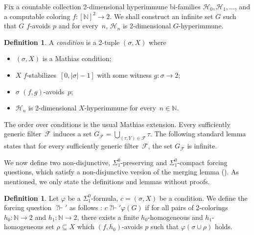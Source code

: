 \documentclass{article}
\def\F{\mathcal{F}}
\def\Hc{\mathcal{H}}
\newcommand{\qvdash}{\operatorname{{?}{\vdash}}}
\newcommand{\NN}[0]{\mathbb{N}}
\def\qt#1{``#1''}%
\def\N{\mathbb{N}}
\def\NN{\mathbb{N}}
\def\F{\mathcal{F}}
\def\Hc{\mathcal{H}}
\def\qt#1{``#1''}%
\numberwithin{theorem}{section}
\newtheorem{lemma}[theorem]{Lemma}
\theoremstyle{definition}
\newtheorem{definition}[theorem]{Definition}
\begin{document}
Fix a countable collection 2-dimensional hyperimmune bi-families $\Hc_0, \Hc_1, \dots$, and a computable coloring $f : [\NN]^2 \to 2$.
We shall construct an infinite set $G$ such that $G$ $f$-avoids $p$ and for every~$n$, $\Hc_n$ is 2-dimensional $G$-hyperimmune. 

\begin{definition}
A \emph{condition} is a 2-tuple $(\sigma,X)$ where \begin{itemize}
    \item $(\sigma,X)$ is a Mathias condition;
    \item $X$ $f$-stabilizes~$[0, |\sigma|-1]$ with some witness $g : \sigma \to 2$;
    \item $\sigma$ $(f, g)$-avoids~$p$;
    \item $\Hc_n$ is 2-dimensional $X$-hyperimmune for every~$n \in \NN$.
\end{itemize}
\end{definition}
The order over conditions is the usual Mathias extension.
Every sufficiently generic filter~$\F$ induces a set $G_\F = \bigcup_{(\tau,Y) \in \F}\tau$.
The following standard lemma states that for every sufficiently generic filter~$\F$, the set $G_\F$ is infinite.



We now define two non-disjunctive, $\Sigma^0_1$-preserving and $\Sigma^0_1$-compact forcing questions, which satisfy a non-disjunctive version of the merging lemma (). As mentioned, we only state the definitions and lemmas without proofs.

\begin{definition}
Let $\varphi$ be a $\Sigma^0_1$-formula, $c = (\sigma, X)$ be a condition. We define the forcing question $\qvdash'$ as follows :
    $c \qvdash' \varphi(G)$ if for all pairs of 2-colorings $h_0 : \N \to 2$ and $h_1 : \N \to 2$, there exists a finite $h_0$-homogeneous and $h_1$-homogeneous set $\rho \subseteq X$ which $(f,h_0)$-avoids $p$ such that $\varphi(\sigma \cup \rho)$ holds.
\end{definition}


\end{document}
